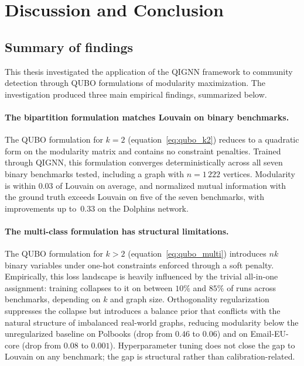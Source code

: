 

\section{Discussion and Conclusion}
\label{sec:conclusion}

\subsection{Summary of findings}
\label{sec:summary}

This thesis investigated the application of the QIGNN framework to
community detection through QUBO formulations of modularity
maximization. The investigation produced three main empirical
findings, summarized below.

\paragraph{The bipartition formulation matches Louvain on binary
benchmarks.} The QUBO formulation for $k=2$
(equation~\eqref{eq:qubo_k2}) reduces to a quadratic form on the
modularity matrix and contains no constraint penalties. Trained
through QIGNN, this formulation converges deterministically across
all seven binary benchmarks tested, including a graph with
$n = 1\,222$ vertices. Modularity is within $0.03$ of Louvain on
average, and normalized mutual information with the ground truth
exceeds Louvain on five of the seven benchmarks, with improvements
up to~$0.33$ on the Dolphins network.

\paragraph{The multi-class formulation has structural limitations.}
The QUBO formulation for $k > 2$ (equation~\eqref{eq:qubo_multi})
introduces $nk$ binary variables under one-hot constraints
enforced through a soft penalty. Empirically, this loss landscape
is heavily influenced by the trivial all-in-one assignment:
training collapses to it on between $10\%$ and $85\%$ of runs
across benchmarks, depending on $k$ and graph size. Orthogonality
regularization suppresses the collapse but introduces a
balance prior that conflicts with the natural structure of
imbalanced real-world graphs, reducing modularity below the
unregularized baseline on Polbooks (drop from $0.46$ to $0.06$)
and on Email-EU-core (drop from $0.08$ to $0.001$). Hyperparameter
tuning does not close the gap to Louvain on any benchmark; the
gap is structural rather than calibration-related.

